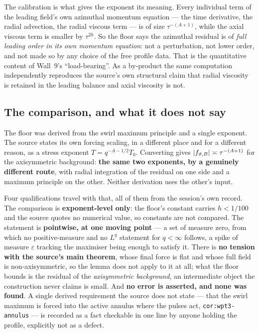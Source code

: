 The calibration is what gives the exponent its meaning. Every individual term
of the leading field's own azimuthal momentum equation --- the time derivative,
the radial advection, the radial viscous term --- is of size
\(\tau^{-(A+1)}\), while the axial viscous term is smaller by \(\tau^{2h}\). So
the floor says the azimuthal residual is of \emph{full leading order in its own
momentum equation}: not a perturbation, not lower order, and not made so by any
choice of the free profile data. That is the quantitative content of Wall~9's
``load-bearing''. As a by-product the same computation independently reproduces
the source's own structural claim that radial viscosity is retained in the
leading balance and axial viscosity is not.

\subsection{The comparison, and what it does not say}

The floor was derived from the swirl maximum principle and a single exponent.
The source states its own forcing scaling, in a different place and for a
different reason, as a stress exponent \(T=q^{-A-1/2}T_0\). Converting gives
\(\left|f_{\vartheta,B}\right|\asymp\tau^{-(A+1)}\) for the axisymmetric background:
\textbf{the same two exponents, by a genuinely different route}, with radial
integration of the residual on one side and a maximum principle on the other.
Neither derivation uses the other's input.

Four qualifications travel with that, all of them from the session's own record.
The comparison is \textbf{exponent-level only}: the floor's constant carries
\(h<1/100\) and the source quotes no numerical value, so constants are not
compared. The statement is \textbf{pointwise, at one moving point} --- a set of
measure zero, from which no positive-measure and no \(L^q\) statement for
\(q<\infty\) follows, a spike of measure \(\varepsilon\) tracking the maximiser
being enough to satisfy it. There is \textbf{no tension with the source's main
theorem}, whose final force is flat and whose full field is non-axisymmetric, so
the lemma does not apply to it at all; what the floor bounds is the residual of
the \emph{axisymmetric background}, an intermediate object the construction
never claims is small. And \textbf{no error is asserted, and none was found}. A
single derived requirement the source does not state --- that the swirl maximum
is forced into the active annulus where the pulses act,
\texttt{cor:wpt3-annulus} --- is recorded as a fact checkable in one line by
anyone holding the profile, explicitly not as a defect.

